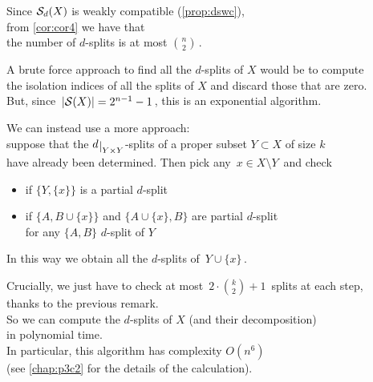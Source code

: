 \documentclass[./main.tex]{subfiles}
\begin{document}
\begin{remark}
    Since ${\mathcal{S}}_d(X)$ is weakly compatible (\autoref{prop:dswc}), \\[1pt]
    from \autoref{cor:cor4} we have that \\[1pt]
    \bsp the number of $d$-splits is at most $\binom{n}{2} \,$.
\end{remark} \bigskip \bigskip

A brute force approach to find all the $d$-splits of $X$ would be to compute \\
the isolation indices of all the splits of $X$ and discard those that are zero. \\[1pt]
But, since $\, \left\lvert{\mathcal{S}}(X)\right\rvert = 2^{n-1} - 1 \,$, this is an exponential algorithm.

We can instead use a more  approach: \\
suppose that the $\restr{d}{\YY}$-splits of a proper subset $Y \subset X$ of size $k$ \\[1pt]
have already been determined. Then pick any $\, x \in X \setminus Y \,$  and check
\begin{itemize}
    \item if $\bigl\{ Y, \{x\} \bigr\}$ is a partial $d$-split
    \item if $\bigl\{ A, B \cup \{x\} \bigr\}$ and $\bigl\{ A \cup \{x\}, B \bigr\}$ are partial $d$-split \\[2pt]
    \bsp for any $\{A,B\}$ $d$-split of $Y$
\end{itemize}

In this way we obtain all the $d$-splits of $\, Y \cup \{x\} \,$.

Crucially, we just have to check at most $\, 2 \cdot \binom{k}{2} + 1 \,$ splits at each step, \\
\bsp thanks to the previous remark. \\
So we can compute the $d$-splits of $X$ (and their decomposition) \\
\bsp in polynomial time. \\
In particular, this algorithm has complexity $O(n^6)$ \\
\bsp (see \autoref{chap:p3c2} for the details of the calculation).

\clearpage
\end{document}
